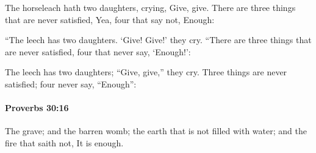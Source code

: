 			\begin{versebox}
					\item[BHS] 
					\item[ASV] The horseleach hath two daughters, crying, Give, give. There are three things that are never satisfied, Yea, four that say not, Enough:
					\item[NIV] “The leech has two daughters. ‘Give! Give!’ they cry. “There are three things that are never satisfied, four that never say, ‘Enough!’:
					\item[NRSV] The leech has two daughters; “Give, give,” they cry. Three things are never satisfied; four never say, “Enough”:
			\end{versebox}

		\paragraph{Proverbs 30:16} %
			\label{PROVERBS-30-16}

			The grave; and the barren womb; the earth that is not filled with water; and the fire that saith not, It is enough.

